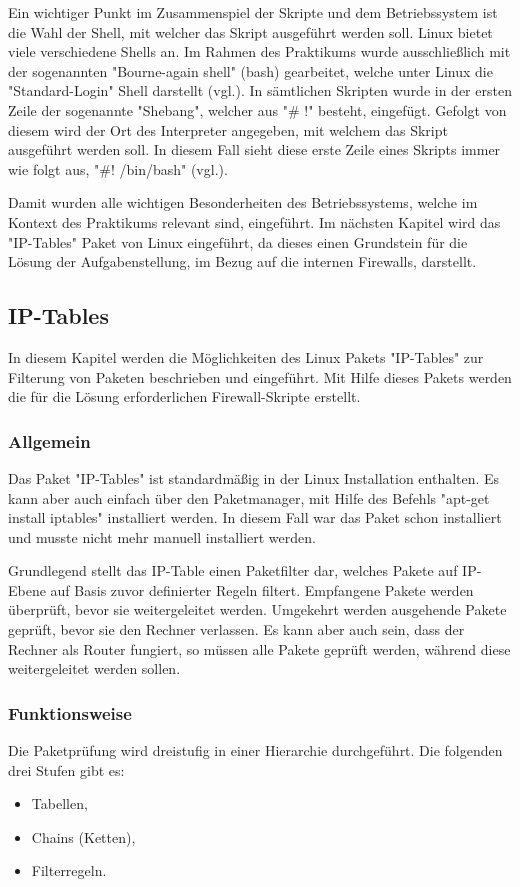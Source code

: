 \documentclass[
a4paper,     %
 headsepline, %
footsepline, %
titlepage,   %
 halfparskip,     %
 fleqn,       %
12pt         %
]{scrartcl}  %
\begin{document}
Ein wichtiger Punkt im Zusammenspiel der Skripte und dem Betriebssystem ist die Wahl der Shell, mit welcher das Skript ausgeführt werden soll. Linux bietet viele verschiedene Shells an. Im Rahmen des Praktikums wurde ausschließlich mit der sogenannten "Bourne-again shell" (bash) gearbeitet, welche unter Linux die "Standard-Login" Shell darstellt (vgl.\cite{bash-2}). In sämtlichen Skripten wurde in der ersten Zeile der sogenannte "Shebang", welcher aus "\# !" besteht, eingefügt. Gefolgt von diesem wird der Ort des Interpreter angegeben, mit welchem das Skript ausgeführt werden soll. In diesem Fall sieht diese erste Zeile eines Skripts immer wie folgt aus, "\#! /bin/bash" (vgl.\cite{shebang-1}). 

Damit wurden alle wichtigen Besonderheiten des Betriebssystems, welche im Kontext des Praktikums relevant sind, eingeführt. Im nächsten Kapitel wird das "IP-Tables" Paket von Linux eingeführt, da dieses einen Grundstein für die Lösung der Aufgabenstellung, im Bezug auf die internen Firewalls, darstellt. 
\subsection{IP-Tables}\label{iptables}
In diesem Kapitel werden die Möglichkeiten des Linux Pakets "IP-Tables" zur Filterung von Paketen beschrieben und eingeführt. Mit Hilfe dieses Pakets werden die für die Lösung erforderlichen Firewall-Skripte erstellt.  

\subsubsection{Allgemein}
Das Paket "IP-Tables" ist standardmäßig in der Linux Installation enthalten. Es kann aber auch einfach über den Paketmanager, mit Hilfe des Befehls "apt-get install iptables" installiert werden. In diesem Fall war das Paket schon installiert und musste nicht mehr manuell installiert werden. 

Grundlegend stellt das IP-Table einen Paketfilter dar, welches Pakete auf IP-Ebene auf Basis zuvor definierter Regeln filtert. Empfangene Pakete werden überprüft, bevor sie weitergeleitet werden. Umgekehrt werden ausgehende Pakete geprüft, bevor sie den Rechner verlassen. Es kann aber auch sein, dass der Rechner als Router fungiert, so müssen alle Pakete geprüft werden, während diese weitergeleitet werden sollen. 
\subsubsection{Funktionsweise}
Die Paketprüfung wird dreistufig in einer Hierarchie durchgeführt. Die folgenden drei Stufen gibt es:
\begin{itemize}
\item Tabellen,
\item Chains (Ketten),
\item Filterregeln.
\end{itemize}
\end{document}
